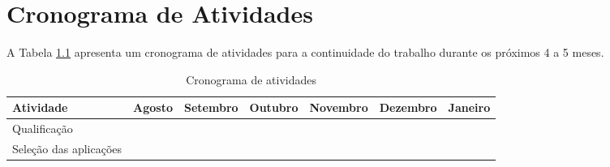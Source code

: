 \chapter{Cronograma de Atividades}

A Tabela \ref{tab:cronograma} apresenta um cronograma de atividades para a continuidade do trabalho
durante os próximos 4 a 5 meses.

\begin{table}[ht]
\centering
\caption{Cronograma de atividades}
\label{tab:cronograma}
\begin{tabular}{|l|l|l|l|l|l|l|l|l|l|l|l|l|l|l|l|l|l|l|l|l|l|l|l|l|}
\hline
\textbf{Atividade}     & \multicolumn{4}{c|}{\textbf{Agosto}}                                              & \multicolumn{4}{c|}{\textbf{Setembro}}                                                                    & \multicolumn{4}{c|}{\textbf{Outubro}}                                                                     & \multicolumn{4}{c|}{\textbf{Novembro}}                                                                    & \multicolumn{4}{c|}{\textbf{Dezembro}}                                                                    & \multicolumn{4}{c|}{\textbf{Janeiro}} \\ \hline
Qualificação           &  & \cellcolor[HTML]{C0C0C0} &                          &                          &                          &                          &                          &                          &                          &                          &                          &                          &                          &                          &                          &                          &                          &                          &                          &                          &   &   &   &                           \\ \hline
Seleção das aplicações &  &                          & \cellcolor[HTML]{C0C0C0} & \cellcolor[HTML]{C0C0C0} &                          &                          &                          &                          &                          &                          &                          &                          &                          &                          &                          &                          &                          &                          &                          &                          &   &   &   &                           \\ \hline

\end{tabular}
\end{table}
